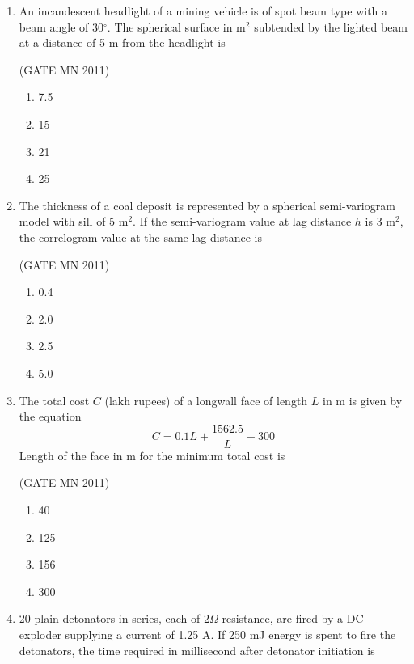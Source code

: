 \documentclass[journal]{IEEEtran}
\begin{document}
\begin{enumerate}
\item An incandescent headlight of a mining vehicle is of spot beam type with a beam angle of 30$^\circ$. 
The spherical surface in m$^2$ subtended by the lighted beam at a distance of 5 m from the headlight is

\hfill(GATE MN 2011)
\begin{multicols}{4}
\begin{enumerate}
  \item 7.5
  \item 15
  \item 21
  \item 25
\end{enumerate}
\end{multicols}

\item The thickness of a coal deposit is represented by a spherical semi-variogram model with sill of 5 m$^2$. 
If the semi-variogram value at lag distance $h$ is 3 m$^2$, the correlogram value at the same lag distance is

\hfill(GATE MN 2011)
\begin{multicols}{4}
\begin{enumerate}
  \item 0.4
  \item 2.0
  \item 2.5
  \item 5.0
\end{enumerate}
\end{multicols}

\item The total cost $C$ (lakh rupees) of a longwall face of length $L$ in m is given by the equation
\[
C = 0.1L + \frac{1562.5}{L} + 300
\]
Length of the face in m for the minimum total cost is

\hfill(GATE MN 2011)
\begin{multicols}{4}
\begin{enumerate}
  \item 40
  \item 125
  \item 156
  \item 300
\end{enumerate}
\end{multicols}

\item 20 plain detonators in series, each of 2$\Omega$ resistance, are fired by a DC exploder supplying a current of 1.25 A. 
If 250 mJ energy is spent to fire the detonators, the time required in millisecond after detonator initiation is


\end{enumerate}
\end{document}
